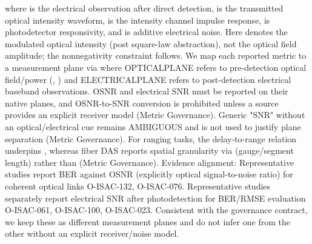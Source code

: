 {}\markdownRendererSoftLineBreak
{}\markdownRendererSoftLineBreak
{}where  is the electrical observation after direct detection,  is the transmitted optical intensity waveform,  is the intensity channel impulse response,  is photodetector responsivity, and  is additive electrical noise. Here  denotes the modulated optical intensity (post square-law abstraction), not the optical field amplitude; the nonnegativity constraint follows.\markdownRendererParagraphSeparator
{} We map each reported metric  to a measurement plane via\markdownRendererSoftLineBreak
{}\markdownRendererSoftLineBreak
{}where OPTICAL\markdownRendererUnderscore{}PLANE refers to pre-detection optical field/power (, ) and ELECTRICAL\markdownRendererUnderscore{}PLANE refers to post-detection electrical baseband observations. OSNR and electrical SNR must be reported on their native planes, and OSNR-to-SNR conversion is prohibited unless a source provides an explicit receiver model (Metric Governance). Generic "SNR" without an optical/electrical cue remains AMBIGUOUS and is not used to justify plane separation (Metric Governance). For ranging tasks, the delay-to-range relation  underpins , whereas fiber DAS reports spatial granularity via  (gauge/segment length) rather than  (Metric Governance).\markdownRendererParagraphSeparator
{}Evidence alignment: Representative studies report BER against OSNR (explicitly optical signal-to-noise ratio) for coherent optical links O-ISAC-132, O-ISAC-076.\markdownRendererSoftLineBreak
{}Representative studies separately report electrical SNR after photodetection for BER/RMSE evaluation O-ISAC-061, O-ISAC-100, O-ISAC-023. Consistent with the governance contract, we keep these as different measurement planes and do not infer one from the other without an explicit receiver/noise model.\markdownRendererInterblockSeparator
